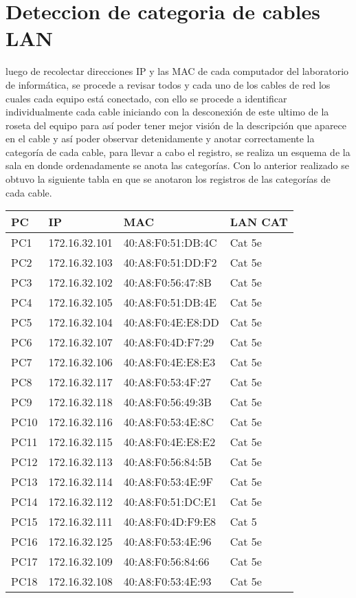 \documentclass[spanish]{udpreport}
\begin{document}
\section{Deteccion de categoria de cables LAN}

luego de recolectar direcciones IP y las MAC de cada computador del laboratorio de informática, se procede a revisar todos y cada uno de los cables de red los cuales cada equipo está conectado, con ello se procede a identificar individualmente cada cable iniciando con la desconexión de este ultimo de la roseta del equipo para así poder tener mejor visión de la descripción que aparece en el cable y así poder observar detenidamente y anotar correctamente la categoría de cada cable, para llevar a cabo el registro, se realiza un esquema de la sala en donde ordenadamente se anota las categorías. Con lo anterior realizado se obtuvo la siguiente tabla en que se anotaron los registros de las categorías de cada cable.

\vspace{2cm}
\begin{table}[H]
\begin{center}
\begin{tabular}{|l|l|l|l|}
\hline
PC & IP & MAC & LAN CAT \\
\hline \hline
PC1 & 172.16.32.101  & 40:A8:F0:51:DB:4C & Cat 5e\\ \hline
PC2 & 172.16.32.103  & 40:A8:F0:51:DD:F2 & Cat 5e\\ \hline
PC3 & 172.16.32.102  & 40:A8:F0:56:47:8B & Cat 5e\\ \hline
PC4 & 172.16.32.105  & 40:A8:F0:51:DB:4E & Cat 5e\\ \hline
PC5 & 172.16.32.104  & 40:A8:F0:4E:E8:DD & Cat 5e\\ \hline
PC6 & 172.16.32.107  & 40:A8:F0:4D:F7:29 & Cat 5e\\ \hline
PC7 & 172.16.32.106  & 40:A8:F0:4E:E8:E3 & Cat 5e\\ \hline
PC8 & 172.16.32.117  & 40:A8:F0:53:4F:27 & Cat 5e\\ \hline
PC9 & 172.16.32.118  & 40:A8:F0:56:49:3B & Cat 5e\\ \hline
PC10 & 172.16.32.116 & 40:A8:F0:53:4E:8C & Cat 5e\\ \hline
PC11 & 172.16.32.115 & 40:A8:F0:4E:E8:E2 & Cat 5e\\ \hline
PC12 & 172.16.32.113 & 40:A8:F0:56:84:5B & Cat 5e\\ \hline
PC13 & 172.16.32.114 & 40:A8:F0:53:4E:9F & Cat 5e\\ \hline
PC14 & 172.16.32.112 & 40:A8:F0:51:DC:E1 & Cat 5e\\ \hline
PC15 & 172.16.32.111 & 40:A8:F0:4D:F9:E8 & Cat 5\\ \hline
PC16 & 172.16.32.125 & 40:A8:F0:53:4E:96 & Cat 5e\\ \hline
PC17 & 172.16.32.109 & 40:A8:F0:56:84:66 & Cat 5e\\ \hline
PC18 & 172.16.32.108 & 40:A8:F0:53:4E:93 & Cat 5e\\ \hline
\end{tabular}
\label{tabla:sencilla}
\end{center}
\end{table}
\end{document}

